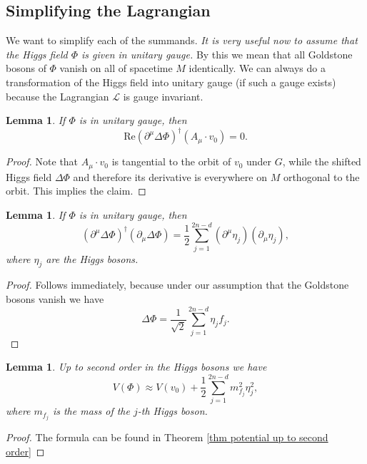 \documentclass[11pt]{amsart}
\newtheorem{lem}[thm]{Lemma}
\theoremstyle{definition}
\theoremstyle{remark}
\numberwithin{equation}{section}
\begin{document}
\subsection{Simplifying the Lagrangian}
We want to simplify each of the summands. {\em It is very useful now to assume that the Higgs field $\Phi$ is given in unitary gauge.} By this we mean that all Goldstone bosons of $\Phi$ vanish on all of spacetime $M$ identically. We can always do a transformation of the Higgs field into unitary gauge (if such a gauge exists) because the Lagrangian $\mathcal{L}$ is gauge invariant.
\begin{lem}If $\Phi$ is in unitary gauge, then 
\begin{equation*}
\mathrm{Re}\left(\partial^\mu\Delta\Phi\right)^\dagger\left(A_\mu\cdot v_0\right)=0.
\end{equation*}
\end{lem}
\begin{proof}Note that $A_\mu\cdot v_0$ is tangential to the orbit of $v_0$ under $G$, while the shifted Higgs field $\Delta\Phi$ and therefore its derivative is everywhere on $M$ orthogonal to the orbit. This implies the claim.
\end{proof}
\begin{lem}If $\Phi$ is in unitary gauge, then 
\begin{equation*}
\left(\partial^\mu\Delta\Phi\right)^\dagger\left(\partial_\mu\Delta\Phi\right)=\frac{1}{2}\sum_{j=1}^{2n-d}\left(\partial^\mu\eta_j\right)\left(\partial_\mu\eta_j\right),
\end{equation*}
where $\eta_j$ are the Higgs bosons.
\end{lem}
\begin{proof}
Follows immediately, because under our assumption that the Goldstone bosons vanish we have 
\begin{equation*}
\Delta\Phi=\frac{1}{\sqrt{2}}\sum_{j=1}^{2n-d}\eta_jf_j.
\end{equation*}
\end{proof}
\begin{lem}Up to second order in the Higgs bosons we have 
\begin{equation*}
V(\Phi)\approx V(v_0)+\frac{1}{2}\sum_{j=1}^{2n-d}m_{f_j}^2\eta_j^2,
\end{equation*}
where $m_{f_j}$ is the mass of the $j$-th Higgs boson.
\end{lem}
\begin{proof}
The formula can be found in Theorem \ref{thm potential up to second order}
\end{proof}
\end{document}
